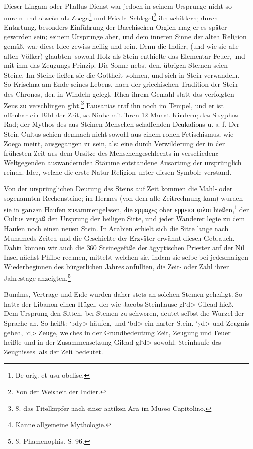 \documentclass[a4paper, 11pt, oneside, polutonikogreek, german]{article}
\begin{document}
Dieser Lingam oder Phallus-Dienst war jedoch in seinem Ursprunge nicht so unrein und obscön als Zoega\footnote{De orig. et usu obelisc.} und Friedr. Schlegel\footnote{Von der Weisheit der Indier.} ihn schildern; durch Entartung, besonders Einführung der Bacchischen Orgien mag er es später geworden sein; seinem Ursprunge aber, und dem inneren Sinne der alten Religion gemäß, war diese Idee gewiss heilig und rein. Denn die Indier, (und wie sie alle alten Völker) glaubten: sowohl Holz als Stein enthielte das Elementar-Feuer, und mit ihm das Zeugungs-Prinzip. Die Sonne nebst den. übrigen Sternen seien Steine. Im Steine ließen sie die Gottheit wohnen, und sich in Stein verwandeln. --- So Krischna am Ende seines Lebens, nach der griechischen Tradition der Stein des Chronos, den in Windeln gelegt, Rhea ihrem Gemahl statt des verfolgten Zeus zu verschlingen gibt.\footnote{S. das Titelkupfer nach einer antiken Ara im Museo Capitolino.} Pausanias traf ihn noch im Tempel, und er ist offenbar ein Bild der Zeit, so Niobe mit ihren 12 Monat-Kindern; des Sisyphus Rad; der Mythos des aus Steinen Menschen schaffenden Deukalions u. s. f. Der-Stein-Cultus schien demnach nicht sowohl aus einem rohen Fetischismus, wie Zoega meint, ausgegangen zu sein, als: eine durch Verwilderung der in der frühesten Zeit aus dem Ursitze des Menschengeschlechts in verschiedene Weltgegenden auswandernden Stämme entstandene Ausartung der ursprünglich reinen. Idee, welche die erste Natur-Religion unter diesen Symbole verstand.

Von der ursprünglichen Deutung des Steins auf Zeit kommen die Mahl- oder sogenannten Rechensteine; im Hermes (von dem alle Zeitrechnung kam) wurden sie in ganzen Haufen zusammengelesen, die ερμαχες ober ερμειοι φιλοι hießen,\footnote{Kanne allgemeine Mythologie.} der Cultus vergaß den Ursprung der heiligen Sitte, und jeder Wanderer legte zu dem Haufen noch einen neuen Stein. In Arabien erhielt sich die Sitte lange nach Muhameds Zeiten und die Geschichte der Erzväter erwähnt diesen Gebrauch. Dahin können wir auch die 360 Steinegefäße der ägyptischen Priester auf der Nil Insel nächst Philoe rechnen, mittelst welchen sie, indem sie selbe bei jedesmaligen Wiederbeginnen des bürgerlichen Jahres anfüllten, die Zeit- oder Zahl ihrer Jahrestage anzeigten.\footnote{S. Phamenophis. S. 96.}

Bündnis, Verträge und Eide wurden daher stets an solchen Steinen geheiligt. So hatte der Libanon einen Hügel, der wie Jacobs Steinhause \<gl`d> Gilead hieß. Dem Ursprung den Sitten, bei Steinen zu schwören, deutet selbst die Wurzel der Sprache an. So heißt: \<`bdy> häufen, und \<`bd> ein harter Stein. \<`yd> und Zeugnis geben, \<`d> Zeuge, welches in der Grundbedeutung Zeit, Zeugung und Feuer heißte und in der Zusammensetzung Gilead \<gl`d> sowohl. Steinhaufe des Zeugnisses, als der Zeit bedeutet.
\end{document}
